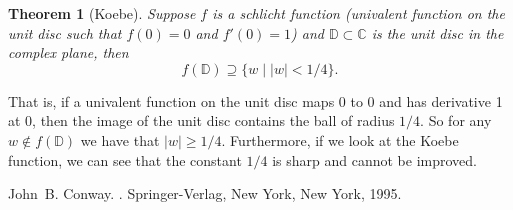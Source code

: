 \documentclass[12pt]{article}
\theoremstyle{theorem}
\newtheorem*{thm}{Theorem}
\theoremstyle{definition}
\begin{document}
\begin{thm}[Koebe]
Suppose $f$ is a schlicht function (univalent function on the unit disc
such that $f(0) = 0$ and $f'(0) = 1$) and ${\mathbb{D}} \subset {\mathbb{C}}$ is the unit disc in the complex plane, then
\begin{equation*}
f({\mathbb{D}}) \supseteq \{ w \mid \lvert w \rvert < 1/4 \} .
\end{equation*}
\end{thm}

That is, if a univalent function on the unit disc maps 0 to 0 and has derivative 
1 at 0, then the image of the unit disc contains the ball of radius $1/4$.  So for any $w \notin f({\mathbb{D}})$ we have that $\lvert w \rvert \geq 1/4$.  Furthermore, if we look at the Koebe function, we can see that the constant $1/4$ is sharp and cannot be improved.

\begin{thebibliography}{9}
John~B. Conway.
{\em {}}.
Springer-Verlag, New York, New York, 1995.
\end{thebibliography}
\end{document}
